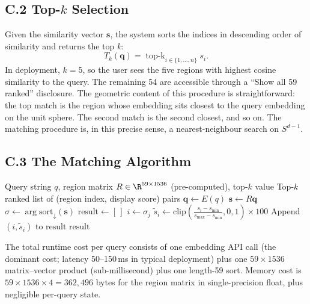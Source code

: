 \documentclass[11pt]{article}
\begin{document}
\subsection*{C.2 Top-$k$ Selection}
Given the similarity vector $\mathbf{s}$, the system sorts the indices in descending order of similarity and returns the top $k$:
\[
T_k(\mathbf{q}) = \mathop{\mathrm{top\text{-}}k}_{i \in \{1, \ldots, n\}} s_i.
\]
In deployment, $k = 5$, so the user sees the five regions with highest cosine similarity to the query. The remaining 54 are accessible through a ``Show all 59 ranked'' disclosure. The geometric content of this procedure is straightforward: the top match is the region whose embedding sits closest to the query embedding on the unit sphere. The second match is the second closest, and so on. The matching procedure is, in this precise sense, a nearest-neighbour search on $S^{d-1}$.

\subsection*{C.3 The Matching Algorithm}

\begin{algorithm}[H]
\caption{Region Resonances matching procedure}
\begin{algorithmic}[1]
\Require Query string $q$, region matrix $R \in \R^{59 \times 1536}$ (pre-computed), top-$k$ value
\Ensure Top-$k$ ranked list of (region index, display score) pairs
\State $\mathbf{q} \gets E(q)$ 
\State $\mathbf{s} \gets R \mathbf{q}$ 
\State $\sigma \gets \arg\!\mathrm{sort}_{\downarrow}(\mathbf{s})$ 
\State $\text{result} \gets [\,]$
  \State $i \gets \sigma_j$
  \State $\tilde{s}_i \gets \mathrm{clip}\!\left(\frac{s_i - s_{\min}}{s_{\max} - s_{\min}}, 0, 1\right) \times 100$
  \State Append $(i, \tilde{s}_i)$ to $\text{result}$
\EndFor
\State \Return $\text{result}$
\end{algorithmic}
\end{algorithm}

The total runtime cost per query consists of one embedding API call (the dominant cost; latency 50--150\,ms in typical deployment) plus one $59 \times 1536$ matrix--vector product (sub-millisecond) plus one length-59 sort. Memory cost is $59 \times 1536 \times 4 = 362{,}496$ bytes for the region matrix in single-precision float, plus negligible per-query state.
\end{document}
